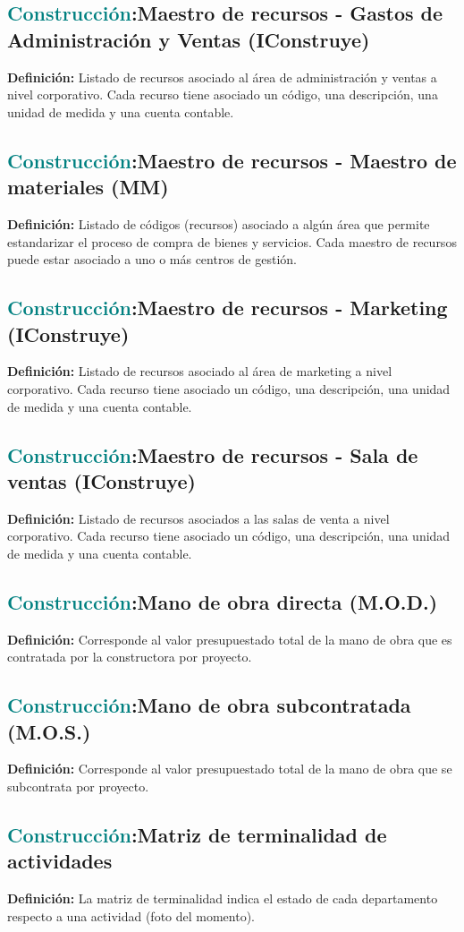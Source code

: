 \documentclass[12pt]{article}
\begin{document}
\subsection{\textcolor{teal}{Construcción}:{Maestro de recursos - Gastos de Administración y Ventas (IConstruye)}}
\textbf{Definición:} Listado de recursos asociado al área de administración y ventas a nivel corporativo. Cada recurso tiene asociado un código, una descripción, una unidad de medida y una cuenta contable.
\subsection{\textcolor{teal}{Construcción}:{Maestro de recursos - Maestro de materiales (MM)}}
\textbf{Definición:} Listado de códigos (recursos) asociado a algún área que permite estandarizar el proceso de compra de bienes y servicios. Cada maestro de recursos puede estar asociado a uno o más centros de gestión.
\subsection{\textcolor{teal}{Construcción}:{Maestro de recursos - Marketing (IConstruye)}}
\textbf{Definición:} Listado de recursos asociado al área de marketing a nivel corporativo. Cada recurso tiene asociado un código, una descripción, una unidad de medida y una cuenta contable.
\subsection{\textcolor{teal}{Construcción}:{Maestro de recursos - Sala de ventas (IConstruye)}}
\textbf{Definición:} Listado de recursos asociados a las salas de venta a nivel corporativo. Cada recurso tiene asociado un código, una descripción, una unidad de medida y una cuenta contable.
\subsection{\textcolor{teal}{Construcción}:{Mano de obra directa (M.O.D.)}}
\textbf{Definición:} Corresponde al valor presupuestado total de la mano de obra que es contratada por la constructora por proyecto.
\subsection{\textcolor{teal}{Construcción}:{Mano de obra subcontratada (M.O.S.)}}
\textbf{Definición:} Corresponde al valor presupuestado total de la mano de obra que se subcontrata por proyecto.
\subsection{\textcolor{teal}{Construcción}:{Matriz de terminalidad de actividades}}
\textbf{Definición:} La matriz de terminalidad indica el estado de cada departamento respecto a una actividad (foto del momento).
\end{document}
